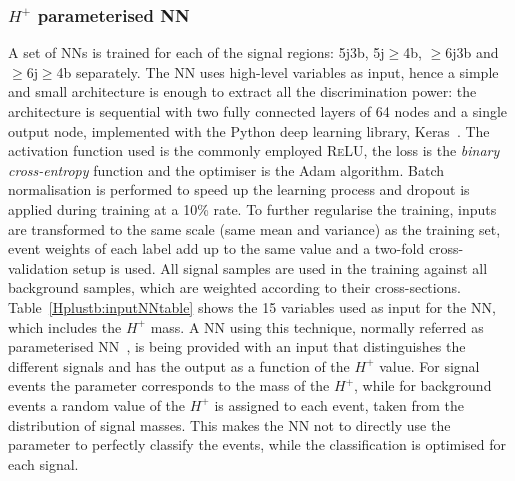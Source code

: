 \subsubsection{$H^+$ parameterised NN}
\label{sec:HplusPNN}
A set of NNs is trained for each of the signal regions: 5j3b, 5j$\geq$4b, $\geq$6j3b and $\geq$6j$\geq$4b separately. The NN uses high-level variables as input, hence a simple and small architecture is enough to extract all the discrimination power: the architecture is sequential with two fully connected layers of 64 nodes and a single output node, implemented with the Python deep learning library, Keras~\cite{chollet2015keras}. The activation function used is the commonly employed \textsc{ReLU}, the loss is the \textit{binary cross-entropy} function and the optimiser is the Adam algorithm. Batch normalisation is performed to speed up the learning process and dropout is applied during training at a 10\% rate. To further regularise the training, inputs are transformed to the same scale (same mean and variance) as the training set, event weights of each label add up to the same value and a two-fold cross-validation setup is used. All signal samples are used in the training against all background samples, which are weighted according to their cross-sections. Table~\ref{Hplustb:inputNNtable} shows the 15 variables used as input for the NN, which includes the $H^+$ mass. A NN using this technique, normally referred as parameterised NN~\cite{Baldi_2016}, is being provided with an input that distinguishes the different signals and has the output as a function of the $H^+$ value. For signal events the parameter corresponds to the mass of the $H^+$, while for background events a random value of the $H^+$ is assigned to each event, taken from the distribution of signal masses. This makes the NN not to directly use the parameter to perfectly classify the events, while the classification is optimised for each signal.

